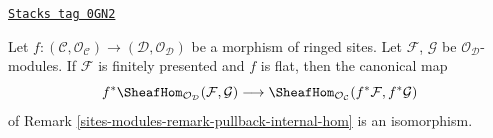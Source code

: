 \begin{lemma}
\label{sites-modules-lemma-pullback-internal-hom}
\href{https://stacks.math.columbia.edu/tag/0GN2}{\texttt{Stacks tag 0GN2}}

Let $f : (\mathcal{C}, \mathcal{O}_\mathcal{C}) \to
(\mathcal{D}, \mathcal{O}_\mathcal{D})$ be a morphism
of ringed sites. Let $\mathcal{F}$, $\mathcal{G}$ be
$\mathcal{O}_\mathcal{D}$-modules.
If $\mathcal{F}$ is finitely presented and $f$ is flat,
then the canonical map
$$
f^*\SheafHom_{\mathcal{O}_\mathcal{D}}(\mathcal{F}, \mathcal{G})
\longrightarrow
\SheafHom_{\mathcal{O}_\mathcal{C}}(f^*\mathcal{F}, f^*\mathcal{G})
$$
of Remark \ref{sites-modules-remark-pullback-internal-hom} is an isomorphism.
\end{lemma}

